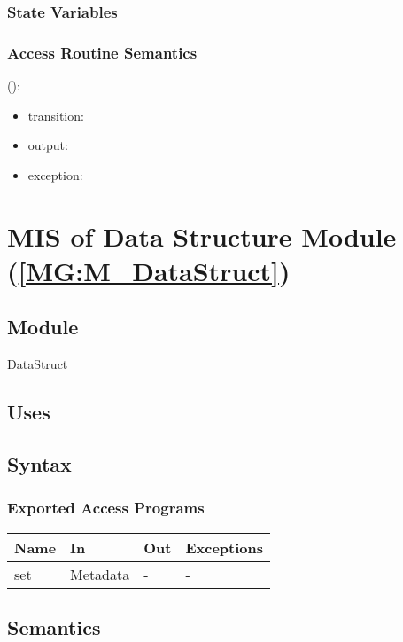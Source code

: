 \documentclass[12pt, titlepage]{article}
\begin{document}
\subsubsection{State Variables}


\subsubsection{Access Routine Semantics}

\noindent {}():
\begin{itemize}
\item transition:  
\item output:  
\item exception:  
\end{itemize}


\section{MIS of Data Structure Module (\texorpdfstring{\cref{MG:M_DataStruct}}))} \label{MIS_DataStruct}

\subsection{Module}
DataStruct
\subsection{Uses}

\subsection{Syntax}

\subsubsection{Exported Access Programs}

\begin{center}
\begin{tabular}{p{2cm} p{4cm} p{4cm} p{2cm}}
\hline
\textbf{Name} & \textbf{In} & \textbf{Out} & \textbf{Exceptions} \\
\hline
set & Metadata & - & - \\
\hline
\end{tabular}
\end{center}

\subsection{Semantics}
\end{document}
